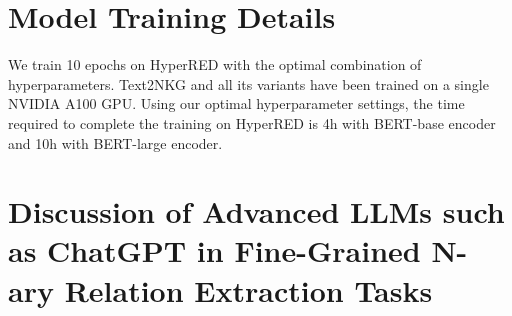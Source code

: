 \documentclass{article} \usepackage{iclr2024_conference,times}
\begin{document}
\begin{table}[h]
\centering
{}

\caption{\label{t6}
Hyperparameter Selection.
}

\end{table}



\section{Model Training Details}
\label{train}
We train 10 epochs on HyperRED with the optimal combination of hyperparameters. Text2NKG and all its variants have been trained on a single NVIDIA A100 GPU. Using our optimal hyperparameter settings, the time required to complete the training on HyperRED is 4h with BERT-base encoder and 10h with BERT-large encoder.


\section{Discussion of Advanced LLMs such as ChatGPT in Fine-Grained N-ary Relation Extraction Tasks}
\label{chatgpt}
\end{document}
